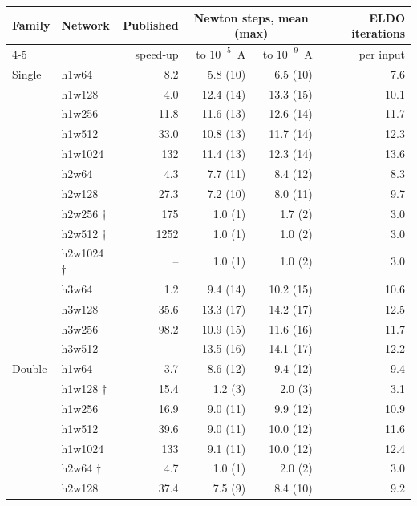 \documentclass[11pt,a4paper]{article}
\begin{document}
\begin{center}
\small
\begin{tabular}{llrrrr}
\toprule
Family & Network & Published & \multicolumn{2}{c}{Newton steps, mean (max)} & ELDO iterations \\
\cmidrule(lr){4-5}
 & & speed-up & to $10^{-5}$~A & to $10^{-9}$~A & per input \\
\midrule
Single & h1w64            & 8.2  & 5.8 (10)  & 6.5 (10)  & 7.6 \\
       & h1w128           & 4.0  & 12.4 (14) & 13.3 (15) & 10.1 \\
       & h1w256           & 11.8 & 11.6 (13) & 12.6 (14) & 11.7 \\
       & h1w512           & 33.0 & 10.8 (13) & 11.7 (14) & 12.3 \\
       & h1w1024          & 132  & 11.4 (13) & 12.3 (14) & 13.6 \\
       & h2w64            & 4.3  & 7.7 (11)  & 8.4 (12)  & 8.3 \\
       & h2w128           & 27.3 & 7.2 (10)  & 8.0 (11)  & 9.7 \\
       & h2w256 $\dagger$ & 175  & 1.0 (1)   & 1.7 (2)   & 3.0 \\
       & h2w512 $\dagger$ & 1252 & 1.0 (1)   & 1.0 (2)   & 3.0 \\
       & h2w1024 $\dagger$& --   & 1.0 (1)   & 1.0 (2)   & 3.0 \\
       & h3w64            & 1.2  & 9.4 (14)  & 10.2 (15) & 10.6 \\
       & h3w128           & 35.6 & 13.3 (17) & 14.2 (17) & 12.5 \\
       & h3w256           & 98.2 & 10.9 (15) & 11.6 (16) & 11.7 \\
       & h3w512           & --   & 13.5 (16) & 14.1 (17) & 12.2 \\
\addlinespace
Double & h1w64            & 3.7  & 8.6 (12)  & 9.4 (12)  & 9.4 \\
       & h1w128 $\dagger$ & 15.4 & 1.2 (3)   & 2.0 (3)   & 3.1 \\
       & h1w256           & 16.9 & 9.0 (11)  & 9.9 (12)  & 10.9 \\
       & h1w512           & 39.6 & 9.0 (11)  & 10.0 (12) & 11.6 \\
       & h1w1024          & 133  & 9.1 (11)  & 10.0 (12) & 12.4 \\
       & h2w64 $\dagger$  & 4.7  & 1.0 (1)   & 2.0 (2)   & 3.0 \\
       & h2w128           & 37.4 & 7.5 (9)   & 8.4 (10)  & 9.2 \\

\end{tabular}
\end{center}
\end{document}
